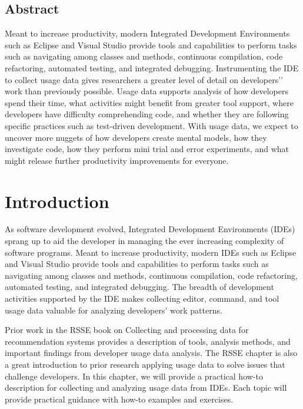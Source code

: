 \begin{center}
\section*{Abstract}
\end{center}
Meant to increase productivity, modern Integrated Development Environments such as Eclipse and Visual Studio provide tools and capabilities to perform tasks such as navigating among classes and methods, continuous compilation, code refactoring, automated testing, and integrated debugging. 
Instrumenting the IDE to collect usage data gives researchers a greater level of detail on developers’' work than previously possible.  Usage data supports analysis of how developers spend their time, what activities might benefit from greater tool support, where developers have difficulty comprehending code, and whether they are following specific practices such as test-driven development.
With usage data, we expect to uncover more nuggets of how developers create mental models, how they investigate code, how they perform mini trial and error experiments, and what might release further productivity improvements for everyone.

\section{Introduction}
As software development evolved, Integrated Development Environments (IDEs) sprang up to aid the developer in managing the ever increasing complexity of software programs.  Meant to increase productivity, modern IDEs such as Eclipse and Visual Studio provide tools and capabilities to perform tasks such as navigating among classes and methods, continuous compilation, code refactoring, automated testing, and integrated debugging.  The breadth of development activities supported by the IDE makes collecting editor, command, and tool usage data valuable for analyzing developers' work patterns.  

Prior work in the RSSE book on Collecting and processing data for recommendation systems provides a description of tools, analysis methods, and important findings from developer usage data analysis.  The RSSE chapter is also a great introduction to prior research applying usage data to solve issues that challenge developers.  In this chapter, we will provide a practical how-to description for collecting and analyzing usage data from IDEs.  Each topic will provide practical guidance with how-to examples and exercises.  

